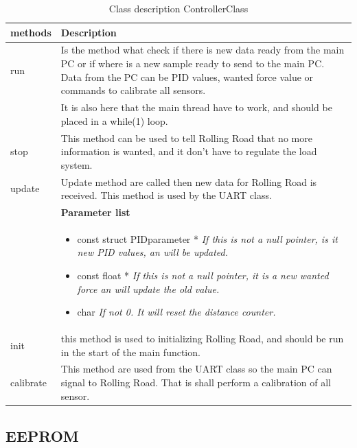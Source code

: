 \begin{table}[H]
	\centering
	\begin{tabular}{|p{5 cm}|p{10 cm}|}
		\hline
		\textbf{methods} & \textbf{Description} \\ \hline
		
		run
		& Is the method what check if there is new data ready from the main PC or if where is a new sample ready to send to the main PC. Data from the PC can be PID values, wanted force value or commands to calibrate all sensors. 
		\\ & It is also here that the main thread have to work, and should be placed in a while(1) loop. \\ 
		\hline
		
		stop
		& This method can be used to tell Rolling Road that no more information is wanted, and it don't have to regulate the load system. 
		\\ \hline
		
		update
		& Update method are called then new data for Rolling Road is received. This method is used by the UART class.
		\\ & \textbf{Parameter list}
		\\ & \begin{itemize}
			\item {\large const struct PIDparameter *}
			\subitem \textit{If this is not a null pointer, is it new PID values, an will be updated.}
			\item {\large const float *}
			\subitem \textit{If this is not a null pointer, it is a new wanted force an will update the old value.}
			\item {\large char}
			\subitem \textit{If not 0. It will reset the distance counter.}
		\end{itemize}
		\\ \hline
		
		init
		& this method is used to initializing Rolling Road, and should be run in the start of the main function.  
		\\ \hline
		
		calibrate
		& This method are used from the UART class so the main PC can signal to Rolling Road. That is shall perform a calibration of all sensor.
		\\ \hline
	\end{tabular}
	\caption{Class description ControllerClass}
	\label{table:Class_description_ControllerClass_RR_PSoC}
\end{table}

\subsection{EEPROM}

